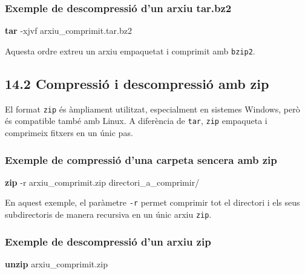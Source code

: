 \documentclass[
  12 pt,
  a4paper,
]{article}
\newenvironment{Shaded}{\begin{snugshade}}{\end{snugshade}}
\newcommand{\AttributeTok}[1]{\textcolor[rgb]{0.13,0.29,0.53}{#1}}
\newcommand{\FunctionTok}[1]{\textcolor[rgb]{0.13,0.29,0.53}{\textbf{#1}}}
\newcommand{\NormalTok}[1]{#1}
\begin{document}
\subsubsection{Exemple de descompressió d'un arxiu
tar.bz2}\label{exemple-de-descompressiuxf3-dun-arxiu-tar.bz2}

\begin{Shaded}
\begin{Highlighting}[]
\FunctionTok{tar} \AttributeTok{{-}xjvf}\NormalTok{ arxiu\_comprimit.tar.bz2}
\end{Highlighting}
\end{Shaded}

Aquesta ordre extreu un arxiu empaquetat i comprimit amb \texttt{bzip2}.

\subsection{14.2 Compressió i descompressió amb
zip}\label{compressiuxf3-i-descompressiuxf3-amb-zip}

El format \texttt{zip} és àmpliament utilitzat, especialment en sistemes
Windows, però és compatible també amb Linux. A diferència de
\texttt{tar}, \texttt{zip} empaqueta i comprimeix fitxers en un únic
pas.

\subsubsection{Exemple de compressió d'una carpeta sencera amb
zip}\label{exemple-de-compressiuxf3-duna-carpeta-sencera-amb-zip}

\begin{Shaded}
\begin{Highlighting}[]
\FunctionTok{zip} \AttributeTok{{-}r}\NormalTok{ arxiu\_comprimit.zip directori\_a\_comprimir/}
\end{Highlighting}
\end{Shaded}

En aquest exemple, el paràmetre \texttt{-r} permet comprimir tot el
directori i els seus subdirectoris de manera recursiva en un únic arxiu
\texttt{zip}.

\subsubsection{Exemple de descompressió d'un arxiu
zip}\label{exemple-de-descompressiuxf3-dun-arxiu-zip}

\begin{Shaded}
\begin{Highlighting}[]
\FunctionTok{unzip}\NormalTok{ arxiu\_comprimit.zip}
\end{Highlighting}
\end{Shaded}
\end{document}
